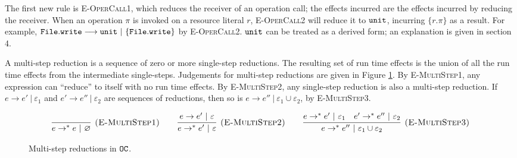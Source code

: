 The first new rule is \textsc{E-OperCall1}, which reduces the receiver of an operation call; the effects incurred are the effects incurred by reducing the receiver.  When an operation $\pi$ is invoked on a resource literal $r$, \textsc{E-OperCall2} will reduce it to $\mathtt{unit}$,
incurring $\{ r.\pi \}$ as a result. For example, $\mathtt{File.write} \longrightarrow \mathtt{unit}~|~\{ \mathtt{File.write} \}$ by \textsc{E-OperCall2}. $\mathtt{unit}$ can be treated as a derived form; an explanation is given in section 4.

A multi-step reduction is a sequence of zero
or more single-step reductions. The resulting set of run time effects is the union of all the run time effects from the intermediate single-steps. Judgements for multi-step reductions are given in Figure \ref{fig:opercalc_multistep_defn}. By \textsc{E-MultiStep1}, any expression can ``reduce'' to itself with no run time effects. By \textsc{E-MultiStep2}, any single-step reduction is also a multi-step reduction. If $e \longrightarrow e'~|~\varepsilon_1$ and $e' \longrightarrow e''~|~\varepsilon_2$ are sequences of reductions, then so is $e \longrightarrow e''~|~\varepsilon_1 \cup \varepsilon_2$, by \textsc{E-MultiStep3}.

\begin{figure}[h]

\noindent
{}

\[
\begin{array}{c}

\infer[\textsc{(E-MultiStep1)}]
	{ e \rightarrow^{*}  e~|~\varnothing}
	{}
	\hspace{5ex}
\infer[\textsc{(E-MultiStep2)}]
	{ e \rightarrow^{*}  e'~|~\varepsilon}
	{ e \rightarrow  e'~|~\varepsilon}
	\hspace{5ex}
\infer[\textsc{(E-MultiStep3)}]
	{ e \rightarrow^{*}  e''~|~\varepsilon_1 \cup \varepsilon_2}
	{ e \rightarrow^{*}  e'~|~\varepsilon_1 &  e' \rightarrow^{*}  e''~|~\varepsilon_2}
\end{array}
\]

\vspace{-7pt}
\caption{Multi-step reductions in $\mathtt{OC}$.}
\label{fig:opercalc_multistep_defn}
\end{figure}

